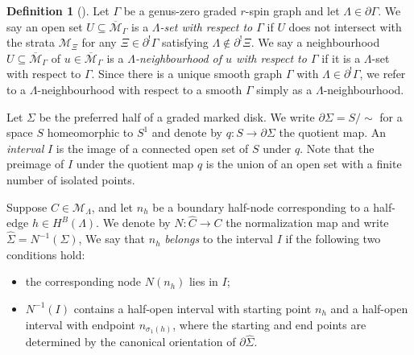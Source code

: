 \documentclass[11pt]{amsart}
\theoremstyle{definition}
\newtheorem{definition}[dummy]{Definition}
\theoremstyle{remark}
\newcommand{\<}{\left<}
\renewcommand{\>}{\right>}
\numberwithin{equation}{section}
\def\Mbar{{\overline{\mathcal M}}}
\begin{document}
\begin{definition}[{\cite[Definition 3.4]{BCT2}}]\label{def positive neighbourhoods}
Let $\Gamma$ be a genus-zero graded $r$-spin graph and let $\Lambda \in \partial\Gamma$.  
We say an open set $U\subseteq \Mbar_\Gamma$ is a \textit{$\Lambda$-set with respect to $\Gamma$} if $U$ does not intersect with the strata ${\mathcal{M}}_\Xi$  for any $\Xi \in\partial^! \Gamma $ satisfying $\Lambda\notin \partial^!\Xi$.
We say a neighbourhood $U\subseteq\Mbar_\Gamma$ of $u\in\Mbar_\Gamma$ is a \textit{$\Lambda$-neighbourhood of $u$ with respect to $\Gamma$} if it is a $\Lambda$-set with respect to $\Gamma$.  Since there is a unique smooth graph $\Gamma$ with $\Lambda\in\partial^!\Gamma$, we refer to a $\Lambda$-neighbourhood with respect to a smooth $\Gamma$ simply as a $\Lambda$-neighbourhood.

Let $\Sigma$ be the preferred half of a graded marked disk. We write $\partial \Sigma = S/\sim$ for a space $S$ homeomorphic to $S^1$ and denote by $q\colon S \to \partial \Sigma$ the quotient map. An \emph{interval} $I$ is the image of a connected open set of $S$ under $q$. Note that the preimage of $I$ under the quotient map $q$ is the union of an open set with a finite number of isolated points.

Suppose $C\in{\mathcal{M}}_\Lambda$, and let $n_h$ be a boundary half-node corresponding to a half-edge $h\in H^B(\Lambda)$. We denote by $N: \widehat{C} \to C$ the normalization map and write $\widehat{\Sigma} = N^{-1}(\Sigma)$, We say that $n_h$ \textit{belongs} to the interval $I$ if the following two conditions hold:
\begin{itemize}
    \item the corresponding node $N(n_{h})$ lies in $I$;
    \item  $N^{-1}(I)$ contains a half-open interval with starting point $n_h$ and a half-open interval with endpoint $n_{\sigma_1(h)}$, where the starting and end points are determined by the canonical orientation of $\partial\widehat{\Sigma}$.
\end{itemize}


\end{definition}
\end{document}
